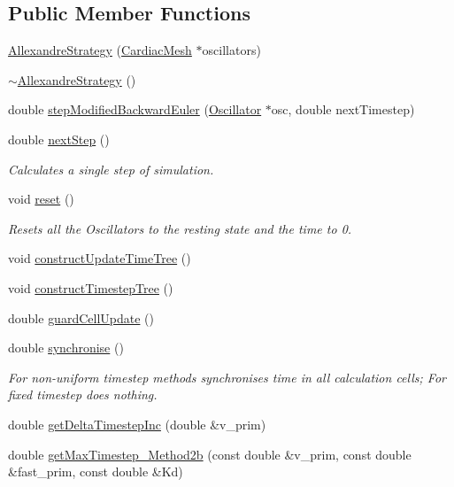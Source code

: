 \subsection*{Public Member Functions}
\begin{DoxyCompactItemize}
\item 
\hyperlink{class_allexandre_strategy_ac14cc10857d943bd555f828fd3c8004d}{Allexandre\+Strategy} (\hyperlink{class_cardiac_mesh}{Cardiac\+Mesh} $\ast$oscillators)
\item 
\hyperlink{class_allexandre_strategy_ac8783c05bbc6e3fea1a99b6ff657fb0d}{$\sim$\+Allexandre\+Strategy} ()
\item 
double \hyperlink{class_allexandre_strategy_a7507036b61a804d7596567dced8f3c73}{step\+Modified\+Backward\+Euler} (\hyperlink{class_oscillator}{Oscillator} $\ast$osc, double next\+Timestep)
\item 
double \hyperlink{class_allexandre_strategy_a418e280a746b6105eb609cbee6ea99fc}{next\+Step} ()
\begin{DoxyCompactList}\small\item\em Calculates a single step of simulation. \end{DoxyCompactList}\item 
void \hyperlink{class_allexandre_strategy_a8f657c6d14d76cef3a312fc862c400f7}{reset} ()
\begin{DoxyCompactList}\small\item\em Resets all the Oscillators to the resting state and the time to 0. \end{DoxyCompactList}\item 
void \hyperlink{class_allexandre_strategy_a19227368bd05ee1d3df2f655387a2dda}{construct\+Update\+Time\+Tree} ()
\item 
void \hyperlink{class_allexandre_strategy_a194aa637bdd931c1f0541cc11e450c79}{construct\+Timestep\+Tree} ()
\item 
double \hyperlink{class_allexandre_strategy_a9ae2720bb39eeb2044a9192a64e0fa95}{guard\+Cell\+Update} ()
\item 
double \hyperlink{class_allexandre_strategy_a8a6038dc52af113157f911665e7d51c2}{synchronise} ()
\begin{DoxyCompactList}\small\item\em For non-\/uniform timestep methods synchronises time in all calculation cells; For fixed timestep does nothing. \end{DoxyCompactList}\item 
double \hyperlink{class_allexandre_strategy_aae541b33a9b2183437624ba5ecc083a8}{get\+Delta\+Timestep\+Inc} (double \&v\+\_\+prim)
\item 
double \hyperlink{class_allexandre_strategy_adbcde09e77b6c3091fc972ca135d05d4}{get\+Max\+Timestep\+\_\+\+Method2b} (const double \&v\+\_\+prim, const double \&fast\+\_\+prim, const double \&Kd)
\end{DoxyCompactItemize}

